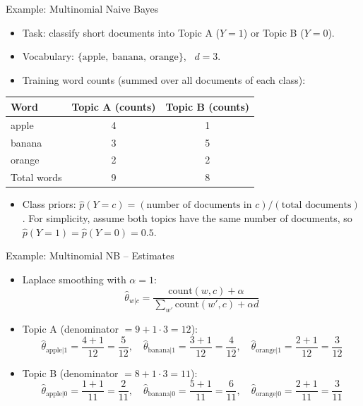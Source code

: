 \documentclass[aspectratio=169]{beamer}
\begin{document}
\begin{frame}{Example: Multinomial Naive Bayes}
\begin{itemize}
  \item Task: classify short documents into Topic A ($Y=1$) or Topic B ($Y=0$).
  \item Vocabulary: $\{\text{apple},\ \text{banana},\ \text{orange}\}$, \ $d=3$.
  \item Training word counts (summed over all documents of each class):
\end{itemize}
\begin{center}
\begin{tabular}{l c c}
\toprule
Word & Topic A (counts) & Topic B (counts) \\
\midrule
apple  & 4 & 1 \\
banana & 3 & 5 \\
orange & 2 & 2 \\
\midrule
Total words & 9 & 8 \\
\bottomrule
\end{tabular}
\end{center}
\begin{itemize}
  \item Class priors: $\hat p(Y=c) = (\text{number of documents in } c) / (\text{total documents})$.
        For simplicity, assume both topics have the same number of documents, so $\hat p(Y=1)=\hat p(Y=0)=0.5$.
\end{itemize}
\end{frame}

\begin{frame}{Example: Multinomial NB -- Estimates}
\begin{itemize}
  \item Laplace smoothing with $\alpha=1$:
  \[
    \hat\theta_{w|c}=\frac{\text{count}(w,c)+\alpha}{\sum_{w'}\text{count}(w',c)+\alpha d}
  \]
  \item Topic A (denominator $=9+1\cdot 3=12$):
  \[
    \hat\theta_{\text{apple}|1}=\frac{4+1}{12}=\frac{5}{12},\quad
    \hat\theta_{\text{banana}|1}=\frac{3+1}{12}=\frac{4}{12},\quad
    \hat\theta_{\text{orange}|1}=\frac{2+1}{12}=\frac{3}{12}
  \]
  \item Topic B (denominator $=8+1\cdot 3=11$):
  \[
    \hat\theta_{\text{apple}|0}=\frac{1+1}{11}=\frac{2}{11},\quad
    \hat\theta_{\text{banana}|0}=\frac{5+1}{11}=\frac{6}{11},\quad
    \hat\theta_{\text{orange}|0}=\frac{2+1}{11}=\frac{3}{11}
  \]
\end{itemize}
\end{frame}
\end{document}
